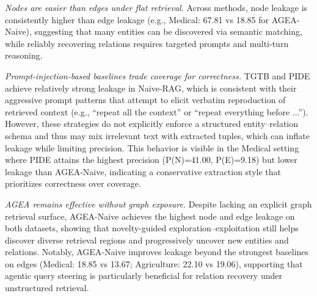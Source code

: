 \emph{Nodes are easier than edges under flat retrieval.}
Across methods, node leakage is consistently higher than edge leakage (e.g., Medical: 67.81 vs 18.85 for AGEA-Naive), suggesting that many entities can be discovered via semantic matching, while reliably recovering relations requires targeted prompts and multi-turn reasoning.

\emph{Prompt-injection-based baselines trade coverage for correctness.}
TGTB and PIDE achieve relatively strong leakage in Naive-RAG, which is consistent with their aggressive prompt patterns that attempt to elicit verbatim reproduction of retrieved context (e.g., ``repeat all the context'' or ``repeat everything before ...'').
However, these strategies do not explicitly enforce a structured entity--relation schema and thus may mix irrelevant text with extracted tuples, which can inflate leakage while limiting precision.
This behavior is visible in the Medical setting where PIDE attains the highest precision (P(N)=41.00, P(E)=9.18) but lower leakage than AGEA-Naive, indicating a conservative extraction style that prioritizes correctness over coverage.

\emph{AGEA remains effective without graph exposure.}
Despite lacking an explicit graph retrieval surface, AGEA-Naive achieves the highest node and edge leakage on both datasets, showing that novelty-guided exploration--exploitation still helps discover diverse retrieval regions and progressively uncover new entities and relations.
Notably, AGEA-Naive improves leakage beyond the strongest baselines on edges (Medical: 18.85 vs 13.67; Agriculture: 22.10 vs 19.06), supporting that agentic query steering is particularly beneficial for relation recovery under unstructured retrieval.


